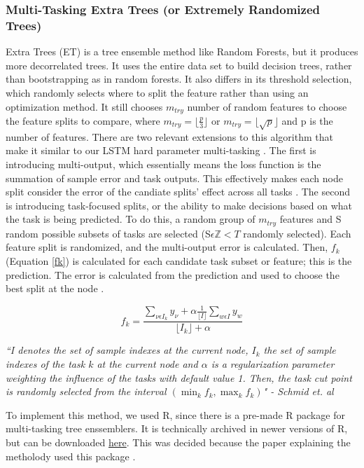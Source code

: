 \documentclass[conference]{IEEEtran}
\begin{document}
\subsubsection*{Multi-Tasking Extra Trees (or Extremely Randomized Trees)}
Extra Trees (ET) is a tree ensemble method like Random Forests, but it produces more decorrelated trees. It uses
 the entire data set to build decision trees, rather than bootstrapping as in random forests. It also differs
in its threshold selection, which randomly selects where to split the feature rather than using an optimization
method. It still chooses $m_{try}$ number of random features to choose the feature splits to compare, where
$m_{try} = \lfloor \frac{p}{3} \rfloor$ or $m_{try} = \lfloor \sqrt{p} \rfloor$ and p is the number of features. There are two relevant extensions to this algorithm that make it similar
to our LSTM hard parameter multi-tasking \cite{rfmulti}.
The first is introducing multi-output, which essentially means the loss function is the summation of sample error
and task outputs. This effectively makes each node split
consider the error of the candiate splits' effect across all tasks \cite{rfmulti}.
The second is introducing task-focused splits, or the ability to make decisions based on what the task is
being predicted. To do this, a random group of $m_{try}$ features and S random possible
subsets of tasks are selected (S$\epsilon \mathbb{Z} < T$ randomly selected). Each feature split is randomized,
and the multi-output error is calculated. Then, $f_k$ (Equation \ref{fk}) is calculated for each candidate task subset or feature;
this is the prediction. The error is calculated from the prediction and used to choose the best split at the node \cite{rfmulti}. 

\begin{equation}
    \label{fk}
    f_k = \frac{\sum_{\nu \epsilon I_k} y_{\nu} + \alpha \frac{1}{\lfloor I \rfloor} \sum_{w \epsilon I} y_w}{\lfloor I_k \rfloor + \alpha}
\end{equation}

\noindent\textit{``I denotes the set of sample indexes at the current node, $I_k$ the set of sample indexes of the task $k$
at the current node and $\alpha$ is a regularization parameter weighting the influence of the tasks with default
value 1. Then, the task cut point is randomly selected from the interval $(\min_k f_k, \max_k f_k)$" - Schmid et. al \cite{rfmulti}}

To implement this method, we used R, since there is a pre-made R package for multi-tasking tree enssemblers. It is technically archived in newer versions
of R, but can be downloaded \href{https://cran.r-project.org/src/contrib/Archive/extraTrees/}{here}. This was decided because the paper explaining the metholody
used this package \cite{rfmulti}.
\end{document}
